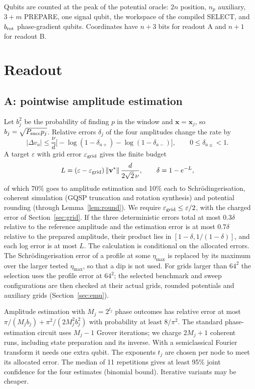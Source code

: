\documentclass[11pt,a4paper]{article}
\theoremstyle{remark}
\newcommand{\x}{\mathbf x}
\newcommand{\vv}{\mathbf v}
\newcommand{\eps}{\varepsilon}
\newcommand{\Psucc}{P_{\rm succ}}
\begin{document}
Qubits are counted at the peak of the potential oracle: $2n$ position,
$n_p$ auxiliary, $3+m$ PREPARE, one signal qubit, the workspace of the compiled SELECT, and $b_{\rm rot}$
phase-gradient qubits. Coordinates have $n+3$ bits for readout A and $n+1$ for readout B.

\section{Readout}
\label{sec:readout}

\subsection{A: pointwise amplitude estimation}

Let $b_j^2$ be the probability of finding $p$ in the window and $\x=\x_j$, so
$b_j=\sqrt{\Psucc p_j}$. Relative errors $\delta_j$ of the four amplitudes
change the rate by
\[
 |\Delta v_a|\le\frac\nu d\bigl[-\log(1-\delta_{a+})
 -\log(1-\delta_{a-})\bigr],\qquad 0\le\delta_{a\pm}<1.
\]
A target $\eps$ with grid error $\eps_{\rm grid}$ gives the finite budget
\begin{equation}
 L=(\eps-\eps_{\rm grid})\,\|\vv^*\|\,\frac{d}{2\sqrt2\,\nu},
 \qquad \delta=1-e^{-L},
 \label{eq:budget}
\end{equation}
of which 70\% goes to amplitude estimation and 10\% each to
Schr\"odingerisation, coherent simulation (GQSP truncation and rotation
synthesis) and potential rounding (through Lemma~\ref{lem:round}). We require
$\eps_{\rm grid}\le\eps/2$, with the charged error of Section~\ref{sec:grid}.
If the three deterministic errors total at most $0.3\delta$ relative to the
reference amplitude and the estimation error is at most $0.7\delta$ relative
to the prepared amplitude, their product lies in
$[1-\delta,1/(1-\delta)]$, and each log error is at most $L$. The calculation is
conditional on the allocated errors. The Schr\"odingerisation error of a profile at
some $\eta_{\max}$ is replaced by its maximum over the larger tested $\eta_{\max}$, so
that a dip is not used. For grids larger than $64^2$ the selection uses the profile
error at $64^2$; the selected benchmark and sweep configurations are then checked at
their actual grids, rounded potentials and auxiliary grids (Section~\ref{sec:emu}).

Amplitude estimation \cite{bhmt} with $M_j=2^{t_j}$ phase outcomes has relative
error at most $\pi/(M_jb_j)+\pi^2/(2M_j^2b_j^2)$ with probability at least
$8/\pi^2$. The standard phase-estimation circuit uses $M_j-1$ Grover
iterations; we charge $2M_j+1$ coherent runs, including state
preparation and its inverse. With a semiclassical Fourier
transform \cite{griffiths} it needs one extra qubit. The exponents $t_j$ are
chosen per node to meet its allocated error. The median of 11 repetitions gives
at least 95\% joint confidence for the four estimates (binomial bound).
Iterative variants \cite{iqae} may be cheaper.
\end{document}
